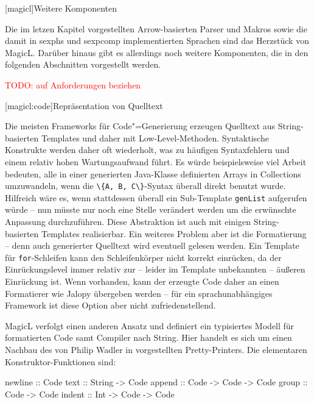 \documentclass[11pt, a4paper, bibgerm]{scrbook}
\newenvironment{DIFnomarkup}{}{}
\newcommand\icode[1]{\lstinline?#1?}
\newcommand{\todo}[1]{
  \textcolor{red}{TODO: #1}
}
\newcommand\lchapter{}
\newcommand\lsection{}
\newcommand\cref{}
\newcommand{\cgen}{Code"=Generierung}
\begin{document}
\lchapter[magicl]{Weitere Komponenten}

Die im letzen Kapitel vorgestellten Arrow-basierten Parser und Makros
sowie die damit in \cref{sexphs} und \cref{sexpcomp} implementierten
Sprachen sind das Herzstück von MagicL. Darüber hinaus gibt es
allerdings noch weitere Komponenten, die in den folgenden Abschnitten
vorgestellt werden.

\todo{auf Anforderungen beziehen}

\lsection[magicl:code]{Repräsentation von Quelltext}

Die meisten Frameworks für \cgen{} erzeugen Quelltext aus
String-basierten Templates und daher mit
Low-Level-Methoden. Syntaktische Konstrukte werden daher oft wiederholt,
was zu häufigen Syntaxfehlern und einem relativ hohen Wartungsaufwand
führt. Es würde beispielsweise viel Arbeit bedeuten, alle in einer
generierten Java-Klasse definierten Arrays in Collections umzuwandeln,
wenn die \icode{\{A, B, C\}}-Syntax überall direkt benutzt
wurde. Hilfreich wäre es, wenn stattdessen überall ein Sub-Template
\icode{genList} aufgerufen würde -- nun müsste nur noch eine Stelle
verändert werden um die erwünschte Anpassung durchzuführen. Diese
Abstraktion ist auch mit einigen String-basierten Templates
realisierbar. Ein weiteres Problem aber ist die Formatierung -- denn auch
generierter Quelltext wird eventuell gelesen werden. Ein Template für
\icode{for}-Schleifen kann den Schleifenkörper nicht korrekt einrücken,
da der Einrückungslevel immer relativ zur -- leider im Template
unbekannten -- äußeren Einrückung ist.  Wenn vorhanden, kann der erzeugte
Code daher an einen Formatierer wie Jalopy \cite{Jalopy} übergeben werden --
für ein sprachunabhängiges Framework ist diese Option aber nicht
zufriedenstellend.

MagicL verfolgt einen anderen Ansatz und definiert ein typisiertes
Modell für formatierten Code samt Compiler nach String. Hier handelt es
sich um einen Nachbau des von Philip Wadler in
\cite[S.223ff]{FunOfProgramming} vorgestellten Pretty-Printers. Die
elementaren Konstruktor-Funktionen sind:
\begin{DIFnomarkup}\begin{code}
newline :: Code
text    :: String -> Code
append  :: Code   -> Code -> Code
group   :: Code   -> Code
indent  :: Int    -> Code -> Code
\end{code}\end{DIFnomarkup}
\end{document}
